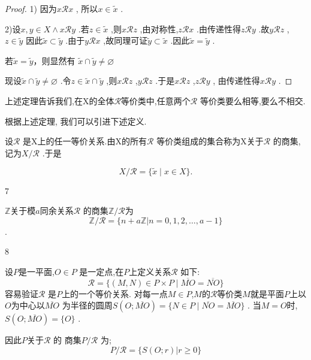 \begin{proof}

1) 因为\(x \mathscr{R} x\) , 所以\(x \in \tilde{x}\) .

2)设\(x,y \in X \land  x \mathscr{R} y\) .若\(z \in \tilde{x}\) ,则\(x \mathscr{R} z\) ,由对称性,\(z \mathscr{R} x\) .由传递性得\(z \mathscr{R} y\) .故\(y \mathscr{R} z\) ,\(z \in \tilde{y}\) 因此\(\tilde{x} \subset \tilde{y}\) .由于\(y \mathscr{R} x\) ,故同理可证\(\tilde{y} \subset \tilde{x}\) .因此\(\tilde{x} = \tilde{y}\) .

若\(\tilde{x} = \tilde{y}\)，则显然有 \(\tilde{x} \cap \tilde{y} \ne \varnothing\)

现设\(\tilde{x} \cap \tilde{y} \ne  \varnothing\) .令\( z \in \tilde{x} \cap \tilde{y}\) ,则\(x \mathscr{R} z\) ,\(y \mathscr{R} z\) .于是\(x \mathscr{R} z\) ,\(z \mathscr{R} y\) , 由传递性得\(x \mathscr{R} y\) .

\end{proof}

上述定理告诉我们,在X的全体\(\mathscr{R}\)等价类中,任意两个\(\mathscr{R}\) 等价类要么相等,要么不相交.

根据上述定理, 我们可以引进下述定义.

\begin{mydef*}{}

设\(\mathscr{R}\) 是X上的任一等价关系.由X的所有\(\mathscr{R}\) 等价类组成的集合称为X关于\(\mathscr{R}\) 的商集,记为\(X/\mathscr{R}\) .于是

\[X/\mathscr{R} = \{ \tilde{x} \mid x \in X \}.\]

\end{mydef*}

\begin{sourceexample}{7}

$\mathbb{Z}$关于模$a$同余关系\(\mathscr{R}\) 的商集\(\mathbb{Z}/\mathscr{R}\)为
\[
\mathbb{Z}/\mathscr{R} = \{n + a\mathbb{Z} | n = 0, 1, 2, \dots, a-1\}
\] .

\end{sourceexample}

\begin{sourceexample}{8}

设$P$是一平面,\(O \in P\) 是一定点,在$P$上定义关系\(\mathscr{R}\) 如下:
\[
\mathscr{R} = \{(M, N) \in P \times P \mid \overline{MO} = \overline{NO}\}
\]
容易验证\(\mathscr{R}\) 是$P$上的一个等价关系. 对每一点\(M \in P\),$M$的\(\mathscr{R}\)等价类$M$就是平面$P$上以$O$为中心以\(\overline{MO}\) 为半径的圆周\(S(O; \overline{MO}) = \{N \in P \mid \overline{NO} = \overline{MO}\}\) . 当$M=O$时,\(S(O;\overline{MO}) = \{O\}\) . 

因此$P$关于\(\mathscr{R}\) 的 商集\(P/\mathscr{R}\) 为;
\[
P/\mathscr{R} = \{S(O; r) | r \geq 0\}
\]

\end{sourceexample}



